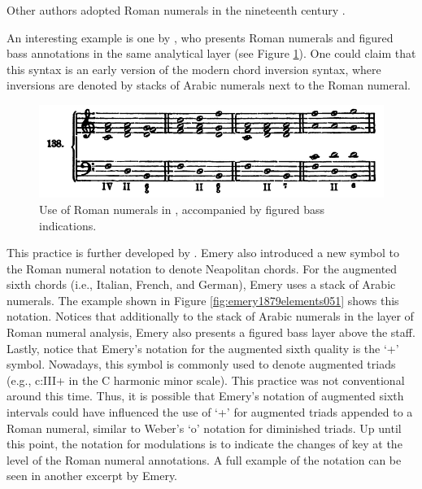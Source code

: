 Other authors adopted Roman numerals in the nineteenth century \parencite{sechter1853grundsatze, richter1860lehrbuch, tiersch1874elementarbuch, tracy1878theory}.

An interesting example is one by \textcite{bussler1878praktische}, who presents Roman numerals and figured bass annotations in the same analytical layer (see Figure \ref{fig:bussler1878praktische063}).
One could claim that this syntax is an early version of the modern chord inversion syntax, where inversions are denoted by stacks of Arabic numerals next to the Roman numeral.

\begin{figure}[h!]
    \centering
    \includegraphics[width=\textwidth]{figures/chapter/2/primary_sources/bussler1878praktische063.png}
    \caption{Use of Roman numerals in \textcite{bussler1878praktische}, accompanied by figured bass indications.}
    \label{fig:bussler1878praktische063}
\end{figure}

This practice is further developed by \textcite{emery1879elements}.
Emery also introduced a new symbol to the Roman numeral notation to denote Neapolitan chords.
For the augmented sixth chords (i.e., Italian, French, and German), Emery uses a stack of Arabic numerals.
The example shown in Figure \ref{fig:emery1879elements051} shows this notation. 
Notices that additionally to the stack of Arabic numerals in the layer of Roman numeral analysis, Emery also presents a figured bass layer above the staff.
Lastly, notice that Emery's notation for the augmented sixth quality is the `+' symbol.
Nowadays, this symbol is commonly used to denote augmented triads (e.g., c:III+ in the C harmonic minor scale).
This practice was not conventional around this time.
Thus, it is possible that Emery's notation of augmented sixth intervals could have influenced the use of `+' for augmented triads appended to a Roman numeral, similar to Weber's `o' notation for diminished triads.
Up until this point, the notation for modulations is to indicate the changes of key at the level of the Roman numeral annotations. 
A full example of the notation can be seen in another excerpt by Emery.

